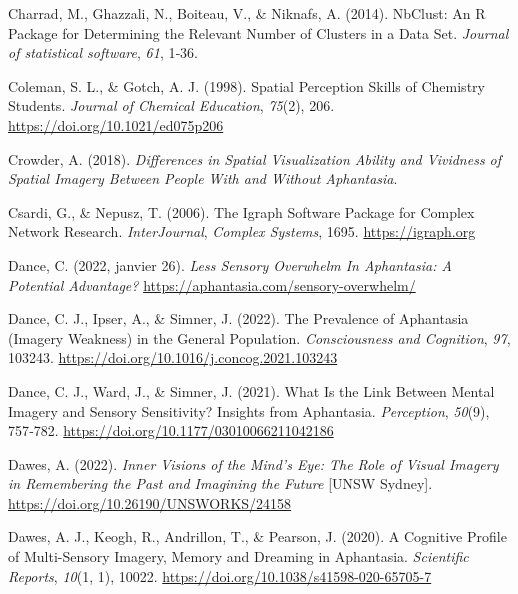 \documentclass[
  12pt,
]{article}
\newlength{\cslhangindent}
\newlength{\cslentryspacingunit} %
\newenvironment{CSLReferences}[2] %
 {%
  \setlength{\parindent}{0pt}
  \ifodd #1
  \let\oldpar\par
  \def\par{\hangindent=\cslhangindent\oldpar}
  \fi
  \setlength{\parskip}{#2\cslentryspacingunit}
 }%
 {}
\begin{document}
\begin{CSLReferences}{1}{0}
\leavevmode{}%
Charrad, M., Ghazzali, N., Boiteau, V., \& Niknafs, A. (2014).
{NbClust}: An {R} Package for Determining the Relevant Number of
Clusters in a Data Set. \emph{Journal of statistical software},
\emph{61}, 1‑36.

\leavevmode{}%
Coleman, S. L., \& Gotch, A. J. (1998). Spatial {Perception Skills} of
{Chemistry Students}. \emph{Journal of Chemical Education},
\emph{75}(2), 206. \url{https://doi.org/10.1021/ed075p206}

\leavevmode{}%
Crowder, A. (2018). \emph{Differences in {Spatial Visualization Ability}
and {Vividness} of {Spatial Imagery Between People With} and {Without
Aphantasia}}.

\leavevmode{}%
Csardi, G., \& Nepusz, T. (2006). The Igraph Software Package for
Complex Network Research. \emph{InterJournal}, \emph{Complex Systems},
1695. \url{https://igraph.org}

\leavevmode{}%
Dance, C. (2022, janvier 26). \emph{Less {Sensory Overwhelm In
Aphantasia}: {A Potential Advantage}?}
\url{https://aphantasia.com/sensory-overwhelm/}

\leavevmode{}%
Dance, C. J., Ipser, A., \& Simner, J. (2022). The Prevalence of
Aphantasia (Imagery Weakness) in the General Population.
\emph{Consciousness and Cognition}, \emph{97}, 103243.
\url{https://doi.org/10.1016/j.concog.2021.103243}

\leavevmode{}%
Dance, C. J., Ward, J., \& Simner, J. (2021). What Is the {Link Between
Mental Imagery} and {Sensory Sensitivity}? {Insights} from {Aphantasia}.
\emph{Perception}, \emph{50}(9), 757‑782.
\url{https://doi.org/10.1177/03010066211042186}

\leavevmode{}%
Dawes, A. (2022). \emph{Inner Visions of the Mind's Eye: {The} Role of
Visual Imagery in Remembering the Past and Imagining the Future}
{[}{UNSW Sydney}{]}. \url{https://doi.org/10.26190/UNSWORKS/24158}

\leavevmode{}%
Dawes, A. J., Keogh, R., Andrillon, T., \& Pearson, J. (2020). A
Cognitive Profile of Multi-Sensory Imagery, Memory and Dreaming in
Aphantasia. \emph{Scientific Reports}, \emph{10}(1, 1), 10022.
\url{https://doi.org/10.1038/s41598-020-65705-7}


\end{CSLReferences}
\end{document}
